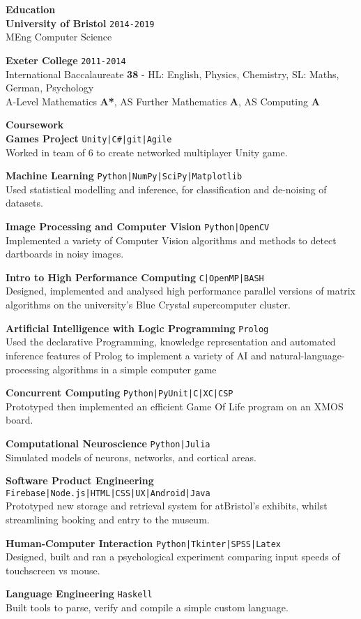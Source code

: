 \documentclass[10pt]{article}
\newcommand{\sect}[1]{{\LARGE{\textbf{#1}}}\vspace{0.1em}\\}
\newcommand{\zz}[3]{{\large\textbf{#1}} \hfill {\small \colorbox{boxcol}{\texttt{#3}} }\\{#2}\vspace{0.5em}}
\newcommand{\li}{\textcolor{linecol}{|}}
\begin{document}
\begin{minipage}[t]{0.7\textwidth} 
\sect{Education}
\zz{University of Bristol}{MEng Computer Science}{2014-2019}

\zz{Exeter College}{International Baccalaureate \textbf{38} {\scriptsize - HL: English, Physics, Chemistry, SL: Maths, German, Psychology}\\
A-Level Mathematics \textbf{A*}, 
AS Further Mathematics \textbf{A}, AS Computing \textbf{A}}{2011-2014}


\sect{Coursework}
\zz{Games Project}
{Worked in team of 6 to create networked multiplayer Unity game.}{Unity\li C\#\li git\li Agile}

\zz{Machine Learning}
{Used statistical modelling and inference, for classification and de-noising of datasets.}{Python\li NumPy\li SciPy\li Matplotlib}

\zz{Image Processing and Computer Vision}
{Implemented a variety of Computer Vision algorithms and methods to detect dartboards in noisy images.}{Python\li OpenCV}

\zz{Intro to High Performance Computing}
{Designed, implemented and analysed high performance parallel versions of matrix algorithms on the university’s Blue Crystal supercomputer cluster.}{C\li OpenMP\li BASH}


\zz{Artificial Intelligence with Logic Programming}
{Used the declarative Programming, knowledge representation and automated inference features of Prolog to implement a variety of AI and natural-language-processing algorithms in a simple computer game}{Prolog}

\zz{Concurrent Computing}
{Prototyped then implemented an efficient Game Of Life program on an XMOS board.}{Python\li PyUnit\li C\li XC\li CSP}

\zz{Computational Neuroscience}
{Simulated models of neurons, networks, and cortical areas.}{Python\li Julia}

\zz{Software Product Engineering}
{Prototyped new storage and retrieval system for atBristol's exhibits, whilst streamlining booking and entry to the museum.}{Firebase\li Node.js\li HTML\li CSS\li UX\li Android\li Java}

\zz{Human-Computer Interaction}{Designed, built and ran a psychological experiment comparing input speeds of touchscreen vs mouse.}{Python\li Tkinter\li SPSS\li Latex}

\zz{Language Engineering}{Built tools to parse, verify and compile a simple custom language.}{Haskell}


\end{minipage}
\end{document}
